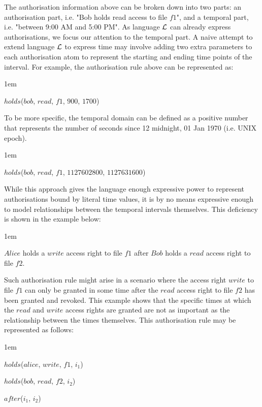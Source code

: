 \documentclass[global,twocolumn,final]{svjour}
\newenvironment{vquote}
  {\begin{list}{}{\leftmargin 1em}\item[]}
  {\end{list}}
\begin{document}
    The authorisation information above can be broken down into two parts: an
    authorisation part, i.e. "Bob holds read access to file $f1$", and a
    temporal part, i.e. "between 9:00 AM and 5:00 PM". As language ${\cal L}$
    can already express authorisations, we focus our attention to the temporal
    part. A naive attempt to extend language ${\cal L}$ to express time may
    involve adding two extra parameters to each authorisation atom to represent
    the starting and ending time points of the interval. For example, the
    authorisation rule above can be represented as:

    \begin{vquote}
      $holds$($bob$, $read$, $f1$, $900$, $1700$)
    \end{vquote}

    To be more specific, the temporal domain can be defined as a positive
    number that represents the number of seconds since 12 midnight, 01 Jan 1970
    (i.e. UNIX epoch).

    \begin{vquote}
      $holds$($bob$, $read$, $f1$, $1127602800$, $1127631600$)
    \end{vquote}

    While this approach gives the language enough expressive power to represent
    authorisations bound by literal time values, it is by no means expressive
    enough to model relationships between the temporal intervals themselves.
    This deficiency is shown in the example below:

    \begin{vquote}
      $Alice$ holds a $write$ access right to file $f1$ after $Bob$ holds a
      $read$ access right to file $f2$.
    \end{vquote}

    Such authorisation rule might arise in a scenario where the access right
    $write$ to file $f1$ can only be granted in some time after the $read$
    access right to file $f2$ has been granted and revoked. This example shows
    that the specific times at which the $read$ and $write$ access rights are
    granted are not as important as the relationship between the times
    themselves. This authorisation rule may be represented as follows:

    \begin{vquote}
      $holds$($alice$, $write$, $f1$, $i_{1}$)

      $holds$($bob$, $read$, $f2$, $i_{2}$)

      $after$($i_{1}$, $i_{2}$)
    \end{vquote}
\end{document}

